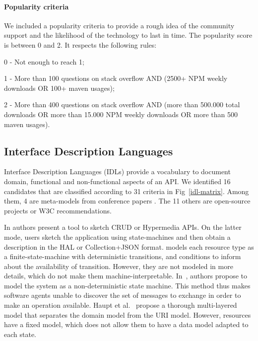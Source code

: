 \paragraph{Popularity criteria}

We included a popularity criteria to provide a rough idea of the community support and the likelihood of the technology to last in time. The popularity score is between 0 and 2. It respects the following rules: 
\begin{inparadesc}
    \item [0 -] Not enough to reach 1;
    \item [1 -] More than 100 questions on stack overflow AND (2500+ NPM weekly downloads OR 100+ maven usages);
    \item [2 -] More than 400 questions on stack overflow AND (more than 500.000 total downloads OR more than 15.000 NPM weekly downloads OR more than 500 maven usages).
\end{inparadesc}

\subsection{Interface Description Languages}

Interface Description Languages (IDLs) provide a vocabulary to document domain, functional and non-functional aspects of an API.
We identified 16 candidates that are classified according to 31 criteria in Fig~\ref{idl-matrix}. Among them, 4 are meta-models from conference papers \cite{10.1109/ICWS.2014.30} \cite{Rapido} \cite{Schreier:2011:MRA:1967428.1967434} \cite{10.1007/978-3-642-22233-7_24}. The 11 others are open-source projects or W3C recommendations.

In \cite{Rapido} authors present a tool to sketch CRUD or Hypermedia APIs. On the latter mode, users sketch the application using state-machines and then obtain a description in the HAL or Collection+JSON format.
\cite{Schreier:2011:MRA:1967428.1967434} models each resource type as a finite-state-machine with deterministic transitions, and conditions to inform about the availability of transition. However, they are not modeled in more details, which do not make them machine-interpretable.
In~\cite{10.1007/978-3-642-22233-7_24}, authors propose to model the system as a non-deterministic state machine. This method thus makes software agents unable to discover the set of messages to exchange in order to make an operation available.
Haupt et al.~\cite{10.1109/ICWS.2014.30} propose a thorough multi-layered model that separates the domain model from the URI model. However, resources have a fixed model, which does not allow them to have a data model adapted to each state.

